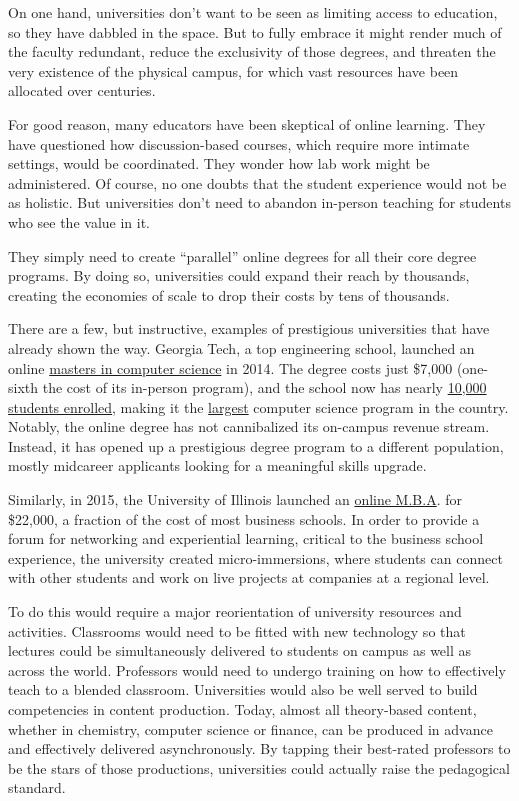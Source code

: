 On one hand, universities don't want to be seen as limiting access to
education, so they have dabbled in the space. But to fully embrace it
might render much of the faculty redundant, reduce the exclusivity of
those degrees, and threaten the very existence of the physical campus,
for which vast resources have been allocated over centuries.

For good reason, many educators have been skeptical of online learning.
They have questioned how discussion-based courses, which require more
intimate settings, would be coordinated. They wonder how lab work might
be administered. Of course, no one doubts that the student experience
would not be as holistic. But universities don't need to abandon
in-person teaching for students who see the value in it.

They simply need to create ``parallel'' online degrees for all their
core degree programs. By doing so, universities could expand their reach
by thousands, creating the economies of scale to drop their costs by
tens of thousands.

There are a few, but instructive, examples of prestigious universities
that have already shown the way. Georgia Tech, a top engineering school,
launched an online \href{https://www.omscs.gatech.edu/}{masters in
computer science} in 2014. The degree costs just \$7,000 (one-sixth the
cost of its in-person program), and the school now has nearly
\href{https://www.omscs.gatech.edu/prospective-students/numbers}{10,000
students enrolled}, making it the
\href{https://www.insidehighered.com/digital-learning/article/2018/03/20/analysis-shows-georgia-techs-online-masters-computer-science}{largest}
computer science program in the country. Notably, the online degree has
not cannibalized its on-campus revenue stream. Instead, it has opened up
a prestigious degree program to a different population, mostly midcareer
applicants looking for a meaningful skills upgrade.

Similarly, in 2015, the University of Illinois launched an
\href{https://onlinemba.illinois.edu/imba-experience/student-experience/}{online
M.B.A}. for \$22,000, a fraction of the cost of most business schools.
In order to provide a forum for networking and experiential learning,
critical to the business school experience, the university created
micro-immersions, where students can connect with other students and
work on live projects at companies at a regional level.

To do this would require a major reorientation of university resources
and activities. Classrooms would need to be fitted with new technology
so that lectures could be simultaneously delivered to students on campus
as well as across the world. Professors would need to undergo training
on how to effectively teach to a blended classroom. Universities would
also be well served to build competencies in content production. Today,
almost all theory-based content, whether in chemistry, computer science
or finance, can be produced in advance and effectively delivered
asynchronously. By tapping their best-rated professors to be the stars
of those productions, universities could actually raise the pedagogical
standard.

